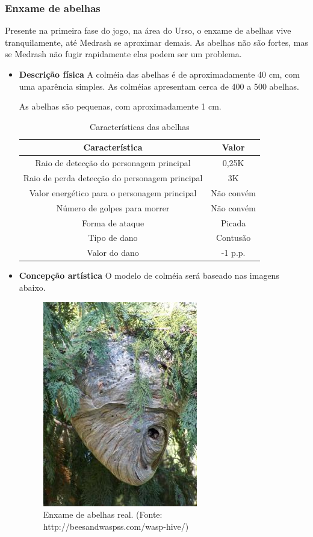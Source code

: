 \subsubsection{Enxame de abelhas}
Presente na primeira fase do jogo, na área do Urso, o enxame de abelhas vive tranquilamente, até Medrash se aproximar demais. As abelhas não são fortes, mas se Medrash não fugir rapidamente elas podem ser um problema.
\begin{itemize}
\item {\bf Descrição física}
A colméia das abelhas é de aproximadamente 40 cm, com uma aparência simples. As colméias apresentam cerca de 400 a 500 abelhas.

As abelhas são pequenas, com aproximadamente 1 cm. 
\begin{table}[H]
\begin{center}
\begin{tabular}{|c|c|}
\hline 
\textbf{Característica} & \textbf{Valor} \\ 
\hline 
Raio de detecção do personagem principal & 0,25K \\ 
\hline 
Raio de perda detecção do personagem principal & 3K \\ 
\hline 
Valor energético para o personagem principal & Não convém\\ 
\hline 
Número de golpes para morrer & Não convém \\ 
\hline 
Forma de ataque & Picada \\ 
\hline 
Tipo de dano & Contusão \\ 
\hline 
Valor do dano & -1 p.p. \\ 
\hline 
\end{tabular} 
\end{center}
\caption{Características das abelhas}
\label{table:abelhas}
\end{table}
\end{itemize}
\begin{itemize}

\item {\bf Concepção artística}
O modelo de colméia será baseado nas imagens abaixo.

 \begin{figure}[H]
 \centering
 \includegraphics[scale=0.7]{Imagens/enxame01.png}
 \caption{Enxame de abelhas real. (Fonte: http://beesandwaspss.com/wasp-hive/)}
\label{img:abelhas}
\end{figure}
\end{itemize}
\newpage
